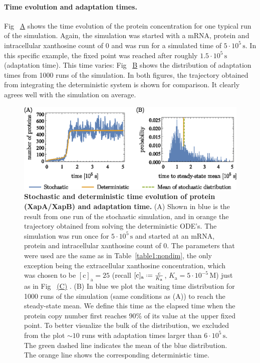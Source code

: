\documentclass[10pt,letterpaper]{article}
\newcommand{\unit}[1]{\,\mathrm{#1}}
\newcommand{\n}[1]{\mathrm{#1}}
\newcommand*{\defeq}{\mathrel{\vcenter{\baselineskip0.5ex \lineskiplimit0pt
			\hbox{\scriptsize.}\hbox{\scriptsize.}}}%
	=}
\newcommand\subref[2]{%
	\def\myref{\getrefnumber{#1}}%
	\hyperref[#1]{\myref\mbox{#2}}%
}
\begin{document}
	\paragraph*{Time evolution and adaptation times.}
	Fig~\subref{fig9:StochT}{A} shows the time evolution of the protein concentration for one typical run of the simulation.
	Again, the simulation was started with a mRNA, protein and intracellular
	xanthosine count of 0 and was run for a simulated time of $5 \cdot 10^5
	\unit{s}$. In this specific example, the fixed point was reached after roughly $1.5 \cdot 10^5
	\unit{s}$ (adaptation time).
	This time varies: Fig~\subref{fig9:StochT}{B} shows the distribution
	of adaptation times from 1000 runs of the simulation.
	In both figures, the trajectory obtained from
	integrating the deterministic system is shown for comparison. It
	clearly agrees well with the simulation on average.
	
	\begin{figure}%
		\centering
		\includegraphics{media/Fig9_evolution.eps}
		\caption{{\bf Stochastic and deterministic time evolution of protein (XapA/XapB) and adaptation time.}
			(A) Shown in blue is the result from one run of the stochastic simulation, and in orange the trajectory obtained from solving the deterministic ODE's. The simulation was run once for $5 \cdot 10^5 \unit{s}$ and started
			at an mRNA, protein and intracellular xanthosine count of 0. The parameters that were used are the same as in
			Table~\ref{table1:nondim}, the only exception being the
			extracellular xanthosine concentration, which was chosen to be
			$\n{[c]_a} = 25$ (recall $\n{[c]_{a}} \defeq \frac{c}{K_{\n{a}}}$,
			$K_{\n{a}} = 5 \cdot 10^{-5} \unit{M}$) just as in
			Fig~\subref{fig8:stochC}{(C)}.
			(B) In blue we plot the waiting time distribution for 1000
			runs of the simulation (same conditions as (A)) to reach
			the steady-state mean.
			We define this time as the elapsed time when the protein
			copy number first reaches 90\% of its value at the upper
			fixed point.
			To better visualize the bulk of the distribution, we
			excluded from the plot $\sim10$ runs with adaptation times
			larger than $6 \cdot 10^5 \unit{s}$.
			The green dashed line indicates the mean of the blue distribution.
			The orange line shows the corresponding deterministic time.
			}
		\label{fig9:StochT}
	\end{figure}
	
\end{document}
